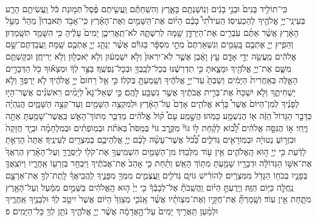 \documentclass[twoside, openany, parskip=half, 11pt]{book}
\begin{document}
\begin{footnotesize}
\begin{multicols}{2}
\\
כִּֽי־תוֹלִ֤יד בָּנִים֙ וּבְנֵ֣י בָנִ֔ים וְנֽוֹשַׁנְתֶּ֖ם בָּאָ֑רֶץ וְהִשְׁחַתֶּ֗ם וַֽעֲשִׂ֤יתֶם פֶּ֨סֶל֙ תְּמ֣וּנַת כֹּ֔ל וַֽעֲשִׂיתֶ֥ם הָרַ֛ע בְּעֵינֵֽי־יְיָ֥ אֱלֹהֶ֖יךָ לְהַכְעִיסֽוֹ׃ הַֽעִידֹ֩תִי֩ בָכֶ֨ם הַיּ֜וֹם אֶת־הַשָּׁמַ֣יִם וְאֶת־הָאָ֗רֶץ כִּֽי־אָבֹ֣ד תֹּֽאבֵדוּן֘ מַהֵר֒ מֵעַ֣ל הָאָ֔רֶץ אֲשֶׁ֨ר אַתֶּ֜ם עֹֽבְרִ֧ים אֶת־הַיַּרְדֵּ֛ן שָׁ֖מָּה לְרִשְׁתָּ֑הּ לֹא־תַֽאֲרִיכֻ֤ן יָמִים֙ עָלֶ֔יהָ כִּ֥י הִשָּׁמֵ֖ד תִּשָּֽׁמֵדֽוּן׃ וְהֵפִ֧יץ יְיָ֛ אֶתְכֶ֖ם בָּֽעַמִּ֑ים וְנִשְׁאַרְתֶּם֙ מְתֵ֣י מִסְפָּ֔ר בַּגּוֹיִ֕ם אֲשֶׁ֨ר יְנַהֵ֧ג יְיָ֛ אֶתְכֶ֖ם שָֽׁמָּה׃ וַֽעֲבַדְתֶּם־שָׁ֣ם אֱלֹהִ֔ים מַֽעֲשֵׂ֖ה יְדֵ֣י אָדָ֑ם עֵ֣ץ וָאֶ֔בֶן אֲשֶׁ֤ר לֹֽא־יִרְאוּן֙ וְלֹ֣א יִשְׁמְע֔וּן וְלֹ֥א יֹֽאכְל֖וּן וְלֹ֥א יְרִיחֻֽן׃ וּבִקַּשְׁתֶּ֥ם מִשָּׁ֛ם אֶת־יְיָ֥ אֱלֹהֶ֖יךָ וּמָצָ֑אתָ כִּ֣י תִדְרְשֶׁ֔נּוּ בְּכָל־לְבָֽבְךָ֖ וּבְכָל־נַפְשֶֽׁךָ׃ 
בַּצַּ֣ר לְךָ֔ וּמְצָא֕וּךָ כֹּ֖ל הַדְּבָרִ֣ים הָאֵ֑לֶּה בְּאַֽחֲרִית֙ הַיָּמִ֔ים וְשַׁבְתָּ֙ עַד־יְיָ֣ אֱלֹהֶ֔יךָ וְשָֽׁמַעְתָּ֖ בְּקֹלֽוֹ׃ כִּ֣י אֵ֤ל רַחוּם֙ יְיָ֣ אֱלֹהֶ֔יךָ לֹ֥א יַרְפְּךָ֖ וְלֹ֣א יַשְׁחִיתֶ֑ךָ וְלֹ֤א יִשְׁכַּח֙ אֶת־בְּרִ֣ית אֲבֹתֶ֔יךָ אֲשֶׁ֥ר נִשְׁבַּ֖ע לָהֶֽם׃ כִּ֣י שְׁאַל־נָא֩ לְיָמִ֨ים רִֽאשֹׁנִ֜ים אֲשֶׁר־הָי֣וּ לְפָנֶ֗יךָ לְמִן־הַיּוֹם֙ אֲשֶׁר֩ בָּרָ֨א אֱלֹהִ֤ים אָדָם֙ עַל־הָאָ֔רֶץ וּלְמִקְצֵ֥ה הַשָּׁמַ֖יִם וְעַד־קְצֵ֣ה הַשָּׁמָ֑יִם הֲנִֽהְיָ֗ה כַּדָּבָ֤ר הַגָּדוֹל֙ הַזֶּ֔ה א֖וֹ הֲנִשְׁמַ֥ע כָּמֹֽהוּ׃ הֲשָׁ֣מַֽע עָם֩ ק֨וֹל אֱלֹהִ֜ים מְדַבֵּ֧ר מִתּוֹךְ־הָאֵ֛שׁ כַּֽאֲשֶׁר־שָׁמַ֥עְתָּ אַתָּ֖ה וַיֶּֽחִי׃ א֣וֹ הֲנִסָּ֣ה אֱלֹהִ֗ים לָ֠ב֠וֹא לָקַ֨חַת ל֣וֹ גּוֹי֘ מִקֶּ֣רֶב גּוֹי֒ בְּמַסֹּת֩ בְּאֹתֹ֨ת וּבְמֽוֹפְתִ֜ים וּבְמִלְחָמָ֗ה וּבְיָ֤ד חֲזָקָה֙ וּבִזְר֣וֹעַ נְטוּיָ֔ה וּבְמֽוֹרָאִ֖ים גְּדֹלִ֑ים כְּ֠כֹ֠ל אֲשֶׁר־עָשָׂ֨ה לָכֶ֜ם יְיָ֧ אֱלֹֽהֵיכֶ֛ם בְּמִצְרַ֖יִם לְעֵינֶֽיךָ׃ אַתָּה֙ הָרְאֵ֣תָ לָדַ֔עַת כִּ֥י יְיָ֖ ה֣וּא הָֽאֱלֹהִ֑ים אֵ֥ין ע֖וֹד מִלְּבַדּֽוֹ׃
 מִן־הַשָּׁמַ֛יִם הִשְׁמִֽיעֲךָ֥ אֶת־קֹל֖וֹ לְיַסְּרֶ֑ךָּ וְעַל־הָאָ֗רֶץ הֶרְאֲךָ֙ אֶת־אִשּׁ֣וֹ הַגְּדוֹלָ֔ה וּדְבָרָ֥יו שָׁמַ֖עְתָּ מִתּ֥וֹךְ הָאֵֽשׁ׃ וְתַ֗חַת כִּ֤י אָהַב֙ אֶת־אֲבֹתֶ֔יךָ וַיִּבְחַ֥ר בְּזַרְע֖וֹ אַֽחֲרָ֑יו וַיּוֹצִֽאֲךָ֧ בְּפָנָ֛יו בְּכֹח֥וֹ הַגָּדֹ֖ל מִמִּצְרָֽיִם׃ לְהוֹרִ֗ישׁ גּוֹיִ֛ם גְּדֹלִ֧ים וַֽעֲצֻמִ֛ים מִמְּךָ֖ מִפָּנֶ֑יךָ לַֽהֲבִֽיאֲךָ֗ לָֽתֶת־לְךָ֧ אֶת־אַרְצָ֛ם נַֽחֲלָ֖ה כַּיּ֥וֹם הַזֶּֽה׃ וְיָֽדַעְתָּ֣ הַיּ֗וֹם וַֽהֲשֵֽׁבֹתָ֘ אֶל־לְבָבֶ֒ךָ֒ כִּ֤י יְיָ֙ ה֣וּא הָֽאֱלֹהִ֔ים בַּשָּׁמַ֣יִם מִמַּ֔עַל וְעַל־הָאָ֖רֶץ מִתָּ֑חַת אֵ֖ין עֽוֹד׃ וְשָֽׁמַרְתָּ֞ אֶת־חֻקָּ֣יו וְאֶת־מִצְוֹתָ֗יו אֲשֶׁ֨ר אָֽנֹכִ֤י מְצַוְּךָ֙ הַיּ֔וֹם אֲשֶׁר֙ יִיטַ֣ב לְךָ֔ וּלְבָנֶ֖יךָ אַֽחֲרֶ֑יךָ וּלְמַ֨עַן תַּֽאֲרִ֤יךְ יָמִים֙ עַל־הָ֣אֲדָמָ֔ה אֲשֶׁ֨ר יְיָ֤ אֱלֹהֶ֛יךָ נֹתֵ֥ן לְךָ֖ כָּל־הַיָּמִֽים׃ פ

\end{multicols}


\end{footnotesize}
\end{document}
